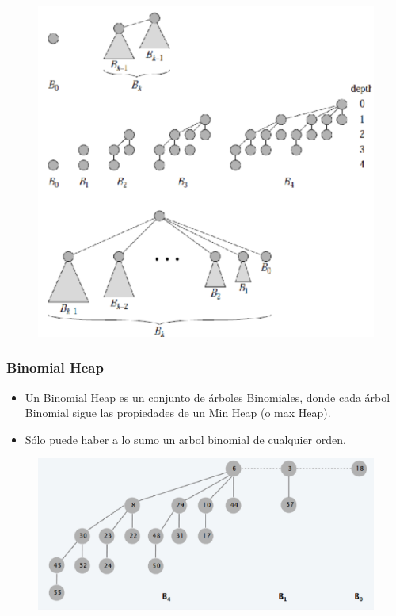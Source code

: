 \documentclass{beamer}
\begin{document}
\begin{frame}
 \begin{figure}
  \centering
  \includegraphics[scale = 0.5]{1.pdf}
  \label{img1}
 \end{figure}
\end{frame}

\begin{frame}
 \frametitle{Binomial Heap}
 \begin{itemize}
  \item Un Binomial Heap es un conjunto de árboles Binomiales,
	donde cada árbol Binomial sigue las propiedades de un Min Heap (o max Heap).
  \item Sólo puede haber a lo sumo un arbol binomial de cualquier orden.
 \end{itemize}
 \begin{figure}
  \centering
  \includegraphics[scale= 0.4]{2.eps}
 \end{figure}
\end{frame}
\end{document}
